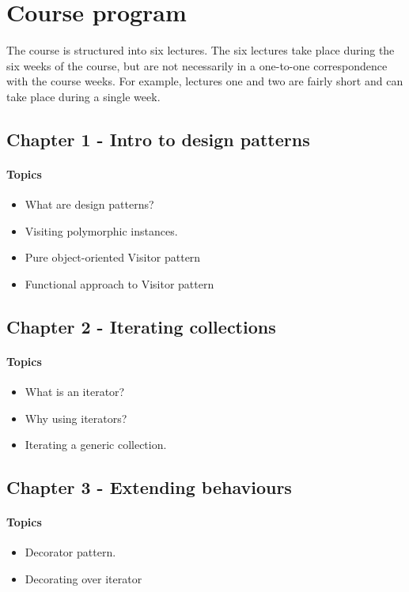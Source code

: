 \section{Course program}
The course is structured into six lectures.
The six lectures take place during the six weeks of the course, but are not necessarily in a one-to-one correspondence with the course weeks. For example, lectures one and two are fairly short and can take place during a single week.

\subsection{Chapter 1 - Intro to design patterns}
\paragraph*{Topics}
\begin{itemize}
	\item What are design patterns?
	\item Visiting polymorphic instances.
	\item Pure object-oriented Visitor pattern
	\item Functional approach to Visitor pattern
\end{itemize}

\subsection{Chapter 2 - Iterating collections}
\paragraph*{Topics}			
\begin{itemize}
	\item What is an iterator?
	\item Why using iterators?
	\item Iterating a generic collection.
\end{itemize}

\subsection{Chapter 3 - Extending behaviours}
\paragraph*{Topics}			
\begin{itemize}
	\item Decorator pattern.
	\item Decorating over iterator
\end{itemize}


